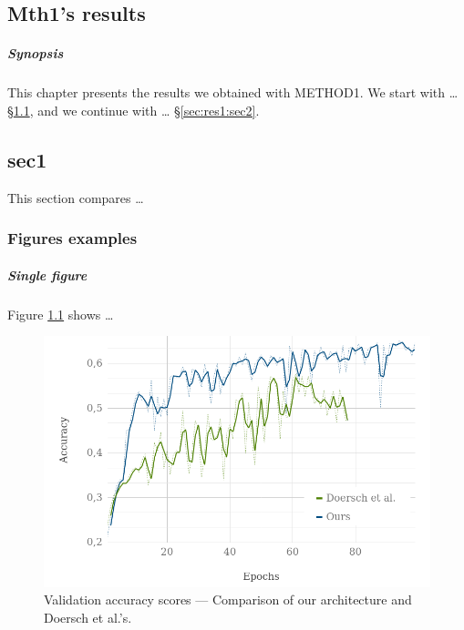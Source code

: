 \begin{fullwidth}
\chapter[MTH1’S RESULTS]{Mth1’s results}
\label{chap:res1}
\end{fullwidth}


\paragraph{Synopsis}
This chapter presents the results we obtained with METHOD1. We start with … §\ref{sec:res1:sec1}, and we continue with … §\ref{sec:res1:sec2}.


\section{sec1}
\label{sec:res1:sec1}
This section compares …


\subsection{Figures examples}

\paragraph{Single figure} Figure \ref{fig:res1:fig1} shows … \blindtext

\begin{figure}
  \centering
  \includegraphics[width=\linewidth]{30-part1/img/resultsicip.png}
  \caption[Validation accuracy --- Comparison of our architecture and Doersch et al.’s]{Validation accuracy scores --- Comparison of our architecture and Doersch et al.’s.}
  \label{fig:res1:fig1}
\end{figure}

